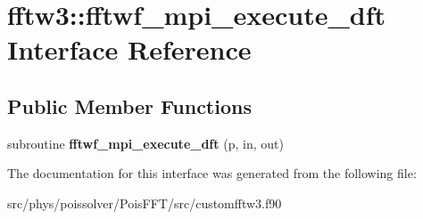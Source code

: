 \hypertarget{interfacefftw3_1_1fftwf__mpi__execute__dft}{}\section{fftw3\+:\+:fftwf\+\_\+mpi\+\_\+execute\+\_\+dft Interface Reference}
\label{interfacefftw3_1_1fftwf__mpi__execute__dft}
\subsection*{Public Member Functions}
\begin{DoxyCompactItemize}
\item 
subroutine {\bfseries fftwf\+\_\+mpi\+\_\+execute\+\_\+dft} (p, in, out)\hypertarget{interfacefftw3_1_1fftwf__mpi__execute__dft_a525957358499c8c99d814df4853ea285}{}\label{interfacefftw3_1_1fftwf__mpi__execute__dft_a525957358499c8c99d814df4853ea285}

\end{DoxyCompactItemize}


The documentation for this interface was generated from the following file\+:\begin{DoxyCompactItemize}
\item 
src/phys/poissolver/\+Pois\+F\+F\+T/src/customfftw3.\+f90\end{DoxyCompactItemize}
